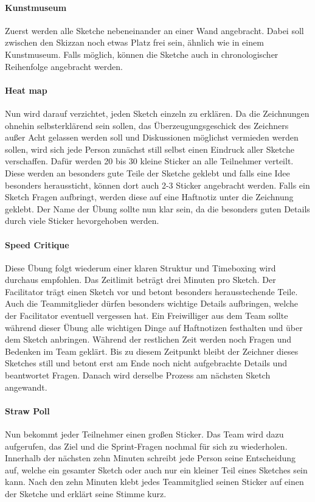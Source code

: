 \paragraph{Kunstmuseum}
Zuerst werden alle Sketche nebeneinander an einer Wand angebracht. Dabei soll zwischen den Skizzan noch etwas Platz frei sein, ähnlich wie in einem Kunstmuseum. Falls möglich, können die Sketche auch in chronologischer Reihenfolge angebracht werden.

\paragraph{Heat map}
Nun wird darauf verzichtet, jeden Sketch einzeln zu erklären. Da die Zeichnungen ohnehin selbsterklärend sein sollen, das Überzeugungsgeschick des Zeichners außer Acht gelassen werden soll und Diskussionen möglichst vermieden werden sollen, wird sich jede Person zunächst still selbst einen Eindruck aller Sketche verschaffen. Dafür werden 20 bis 30 kleine Sticker an alle Teilnehmer verteilt. Diese werden an besonders gute Teile der Sketche geklebt und falls eine Idee besonders heraussticht, können dort auch 2-3 Sticker angebracht werden. Falls ein Sketch Fragen aufbringt, werden diese auf eine Haftnotiz unter die Zeichnung geklebt. Der Name der Übung sollte nun klar sein, da die besonders guten Details durch viele Sticker hevorgehoben werden. 

\paragraph{Speed Critique}
Diese Übung folgt wiederum einer klaren Struktur und Timeboxing wird durchaus empfohlen. Das Zeitlimit beträgt drei Minuten pro Sketch. Der Facilitator trägt einen Sketch vor und betont besonders herausstechende Teile. Auch die Teammitglieder dürfen besonders wichtige Details aufbringen, welche der Facilitator eventuell vergessen hat. Ein Freiwilliger aus dem Team sollte während dieser Übung alle wichtigen Dinge auf Haftnotizen festhalten und über dem Sketch anbringen. Während der restlichen Zeit werden noch Fragen und Bedenken im Team geklärt. Bis zu diesem Zeitpunkt bleibt der Zeichner dieses Sketches still und betont erst am Ende noch nicht aufgebrachte Details und beantwortet Fragen. Danach wird derselbe Prozess am nächsten Sketch angewandt.

\paragraph{Straw Poll}
Nun bekommt jeder Teilnehmer einen großen Sticker. Das Team wird dazu aufgerufen, das Ziel und die Sprint-Fragen nochmal für sich zu wiederholen. Innerhalb der nächsten zehn Minuten schreibt jede Person seine Entscheidung auf, welche ein gesamter Sketch oder auch nur ein kleiner Teil eines Sketches sein kann. Nach den zehn Minuten klebt jedes Teammitglied seinen Sticker auf einen der Sketche und erklärt seine Stimme kurz.


